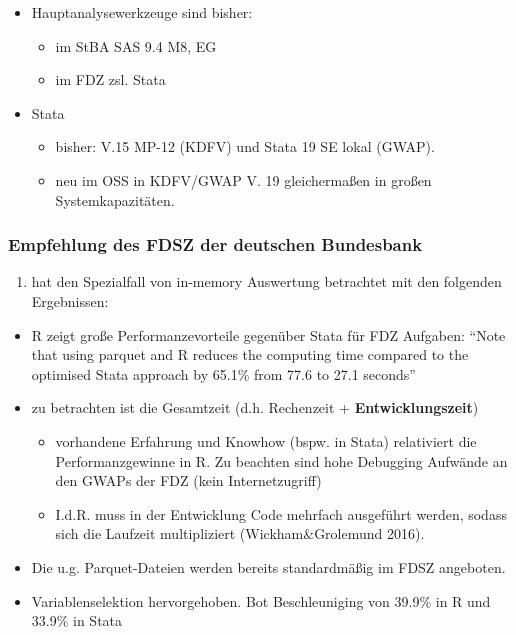 \documentclass[
  german,
  10pt,
  twoside]{article}
\providecommand{\tightlist}{%
  \setlength{\itemsep}{0pt}\setlength{\parskip}{0pt}}
\begin{document}
\begin{itemize}
\tightlist
\item
  Hauptanalysewerkzeuge sind bisher:

  \begin{itemize}
  \tightlist
  \item
    im StBA SAS 9.4 M8, EG
  \item
    im FDZ zsl. Stata
  \end{itemize}
\item
  Stata

  \begin{itemize}
  \tightlist
  \item
    bisher: V.15 MP-12 (KDFV) und Stata 19 SE lokal (GWAP).
  \item
    neu im OSS in KDFV/GWAP V. 19 gleichermaßen in großen
    Systemkapazitäten.
  \end{itemize}
\end{itemize}

\subsubsection{Empfehlung des FDSZ der deutschen
Bundesbank}\label{empfehlung-des-fdsz-der-deutschen-bundesbank}

\begin{enumerate}
\def\labelenumi{(\arabic{enumi})}
\tightlist
\item
  hat den Spezialfall von in-memory Auswertung betrachtet mit den
  folgenden Ergebnissen:
\end{enumerate}

\begin{itemize}
\tightlist
\item
  R zeigt große Performanzevorteile gegenüber Stata für FDZ Aufgaben:
  ``Note that using parquet and R reduces the computing time compared to
  the optimised Stata approach by 65.1\% from 77.6 to 27.1 seconds''
\item
  zu betrachten ist die Gesamtzeit (d.h. Rechenzeit +
  \textbf{Entwicklungszeit})

  \begin{itemize}
  \tightlist
  \item
    vorhandene Erfahrung und Knowhow (bspw. in Stata) relativiert die
    Performanzgewinne in R. Zu beachten sind hohe Debugging Aufwände an
    den GWAPs der FDZ (kein Internetzugriff)
  \item
    I.d.R. muss in der Entwicklung Code mehrfach ausgeführt werden,
    sodass sich die Laufzeit multipliziert (Wickham\&Grolemund 2016).
  \end{itemize}
\item
  Die u.g. Parquet-Dateien werden bereits standardmäßig im FDSZ
  angeboten.
\item
  Variablenselektion hervorgehoben. Bot Beschleuniging von 39.9\% in R
  und 33.9\% in Stata
\end{itemize}
\end{document}
